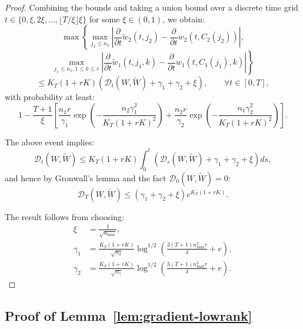 \documentclass[nohyperref]{article}
\theoremstyle{plain}
\theoremstyle{definition}
\theoremstyle{remark}
\begin{document}
\begin{proof}
Combining the bounds and taking a union bound over a discrete time grid $t \in \{0, \xi, 2\xi, \ldots, \lfloor T/\xi\rfloor\xi\}$ for some $\xi \in (0,1)$, we obtain:
\[
\max\left\{\max_{j_2 \le n_2}\left|\frac{\partial}{\partial t}\tilde{w}_2(t, j_2) - \frac{\partial}{\partial t}w_2(t, C_2(j_2))\right|,\right.
\]
\[
\left.\max_{j_1 \le n_1, 1 \le k \le r}\left|\frac{\partial}{\partial t}\tilde{w}_1(t, j_1, k) - \frac{\partial}{\partial t}w_1(t, C_1(j_1), k)\right|\right\}
\]
\[
\le K_T(1+rK)(\mathscr{D}_t(W, \tilde{W}) + \gamma_1 + \gamma_2 + \xi), \qquad \forall t \in [0, T],
\]
with probability at least:
\[
1 - \frac{T+1}{\xi}\left[\frac{n_1r}{\gamma_1}\exp\left(-\frac{n_2\gamma_1^2}{K_T(1+rK)^2}\right) + \frac{n_2r}{\gamma_2}\exp\left(-\frac{n_1\gamma_2^2}{K_T(1+rK)^2}\right)\right].
\]

The above event implies:
\[
\mathscr{D}_t(W, \tilde{W}) \le K_T(1+rK)\int_0^t(\mathscr{D}_s(W, \tilde{W}) + \gamma_1 + \gamma_2 + \xi)ds,
\]
and hence by Gronwall's lemma and the fact $\mathscr{D}_0(W, \tilde{W}) = 0$:
\[
\mathscr{D}_T(W, \tilde{W}) \le (\gamma_1 + \gamma_2 + \xi)e^{K_T(1+rK)}.
\]

The result follows from choosing:
\begin{align*}
\xi &= \frac{1}{\sqrt{n_{\max}}}, \\
\gamma_1 &= \frac{K_T(1+rK)}{\sqrt{n_2}}\log^{1/2}\left(\frac{3(T+1)n_{\max}^2r}{\delta} + e\right), \\
\gamma_2 &= \frac{K_T(1+rK)}{\sqrt{n_1}}\log^{1/2}\left(\frac{3(T+1)n_{\max}^2r}{\delta} + e\right).
\end{align*}
\end{proof}

\subsection{Proof of Lemma~\ref{lem:gradient-lowrank}}
\end{document}
